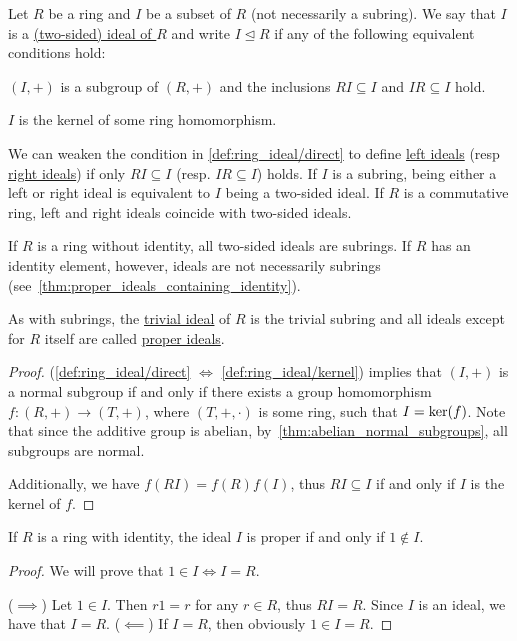 \begin{definition}\label{def:ring_ideal}
  Let $R$ be a ring and $I$ be a subset of $R$ (not necessarily a subring). We say that $I$ is a \ul{(two-sided) ideal of $R$} and write $I \unlhd R$ if any of the following equivalent conditions hold:
  \begin{defenum}
    \item\label{def:ring_ideal/direct} $(I, +)$ is a subgroup of $(R, +)$ and the inclusions $RI \subseteq I$ and $IR \subseteq I$ hold.
    \item\label{def:ring_ideal/kernel} $I$ is the kernel of some ring homomorphism.
  \end{defenum}

  We can weaken the condition in \ref{def:ring_ideal/direct} to define \ul{left ideals} (resp \ul{right ideals}) if only $RI \subseteq I$ (resp. $IR \subseteq I$) holds. If $I$ is a subring, being either a left or right ideal is equivalent to $I$ being a two-sided ideal. If $R$ is a commutative ring, left and right ideals coincide with two-sided ideals.

  If $R$ is a ring without identity, all two-sided ideals are subrings. If $R$ has an identity element, however, ideals are not necessarily subrings (see~\cref{thm:proper_ideals_containing_identity}).

  As with subrings, the \ul{trivial ideal} of $R$ is the trivial subring and all ideals except for $R$ itself are called \ul{proper ideals}.
\end{definition}
\begin{proof}
  (\ref{def:ring_ideal/direct} $\iff$ \ref{def:ring_ideal/kernel})  implies that $(I, +)$ is a normal subgroup if and only if there exists a group homomorphism $f: (R, +) \to (T, +)$, where $(T, +, \cdot)$ is some ring, such that $I = \operatorname{ker}(f)$. Note that since the additive group is abelian, by~\cref{thm:abelian_normal_subgroups}, all subgroups are normal.

  Additionally, we have $f(RI) = f(R)f(I)$, thus $RI \subseteq I$ if and only if $I$ is the kernel of $f$.
\end{proof}

\begin{proposition}\label{thm:proper_ideals_containing_identity}
  If $R$ is a ring with identity, the ideal $I$ is proper if and only if $1 \not\in I$.
\end{proposition}
\begin{proof}
  We will prove that $1 \in I \iff I = R$.

  ($\implies$) Let $1 \in I$. Then $r1 = r$ for any $r \in R$, thus $RI = R$. Since $I$ is an ideal, we have that $I = R$.
  ($\impliedby$) If $I = R$, then obviously $1 \in I = R$.
\end{proof}

